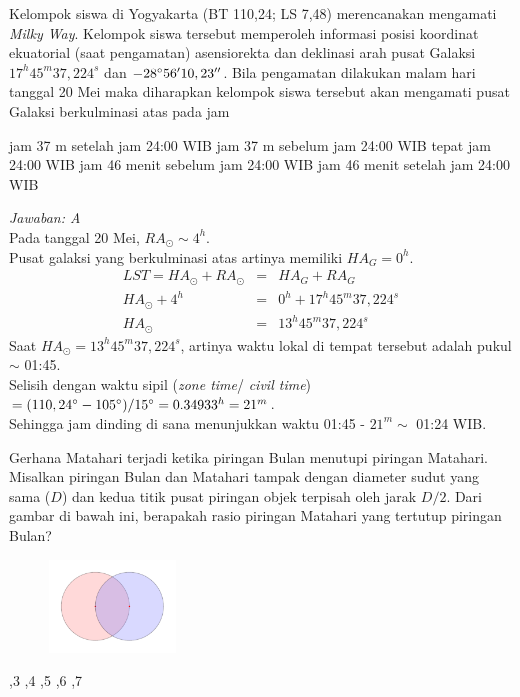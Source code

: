 \documentclass[11pt,fleqn, a4paper]{exam}
\begin{document}
\begin{questions}
\vspace{0.5cm}
\question Kelompok siswa di Yogyakarta (BT 110,24; LS 7,48) merencanakan mengamati \textit{Milky Way}. Kelompok siswa tersebut memperoleh informasi posisi koordinat ekuatorial (saat pengamatan) asensiorekta dan deklinasi arah pusat Galaksi $17^h45^m37,224^s$ dan $-28\degree56'10,23''$. Bila pengamatan dilakukan malam hari tanggal 20 Mei maka diharapkan kelompok siswa tersebut akan mengamati pusat Galaksi berkulminasi atas pada jam
\begin{choices}
 jam 37 m setelah jam 24:00 WIB
 jam 37 m sebelum jam 24:00 WIB
\choice tepat jam 24:00 WIB
 jam 46 menit sebelum jam 24:00 WIB
 jam 46 menit setelah jam 24:00 WIB
\end{choices}

\textit{Jawaban: A}\\
Pada tanggal 20 Mei, $RA_{\odot} \sim 4^h$.\\
Pusat galaksi yang berkulminasi atas artinya memiliki $HA_{G} = 0^{h}$.
\begin{eqnarray*}
LST = HA_{\odot} + RA_{\odot} &=& HA_{G} + RA_{G}\\
HA_{\odot} + 4^{h} &=& 0^{h} + 17^{h} 45^{m} 37,224^{s}\\
HA_{\odot} &=& 13^{h} 45^{m} 37,224^{s}
\end{eqnarray*}
Saat $HA_{\odot} = 13^{h} 45^{m} 37,224^{s}$, artinya waktu lokal di tempat tersebut adalah pukul $\sim$ 01:45.\\
Selisih dengan waktu sipil (\textit{zone time}/ \textit{civil time}) $= (110,24\degree - 105\degree)/15\degree = 0.34933^h = 21^m$.\\
Sehingga jam dinding di sana menunjukkan waktu 01:45 - $21^{m} \sim$ 01:24 WIB.  

\vspace{0.5cm}
\question Gerhana Matahari terjadi ketika piringan Bulan menutupi piringan Matahari. Misalkan piringan Bulan dan Matahari tampak dengan diameter sudut yang sama ($D$) dan kedua titik pusat piringan objek terpisah oleh jarak $D/2$. Dari gambar di bawah ini, berapakah rasio piringan Matahari yang tertutup piringan Bulan?
\begin{figure}[H]
\centering
\includegraphics[width=0.3\textwidth]{gambar/duaLingkaran.pdf}
\end{figure}
\begin{choices}
,3
,4
,5
,6
,7
\end{choices}


\end{questions}
\end{document}
